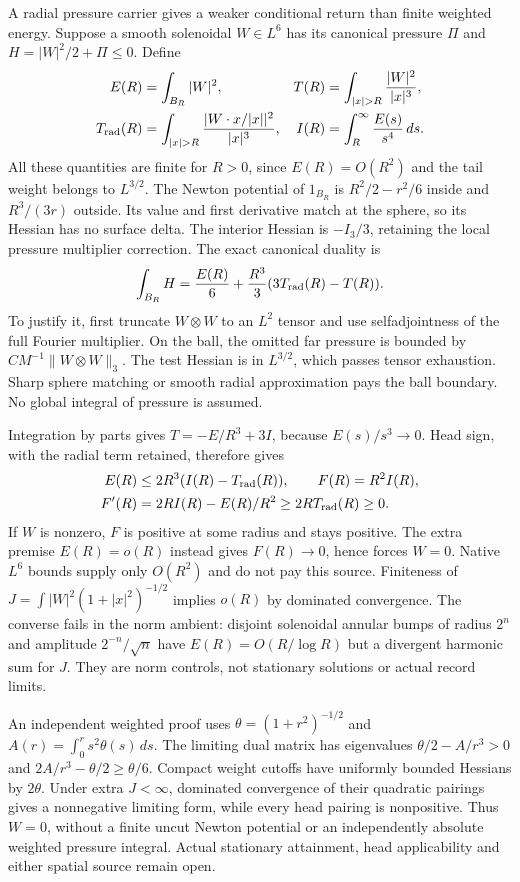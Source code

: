 \documentclass[11pt]{article}
\begin{document}
A radial pressure carrier gives a weaker conditional return than finite
weighted energy. Suppose a smooth solenoidal $W\in L^6$ has its canonical
pressure $\Pi$ and $H=|W|^2/2+\Pi\le0$. Define
\[
 \begin{aligned}
 E(R)&=\int_{B_R}|W|^2,&
 T(R)&=\int_{|x|>R}\frac{|W|^2}{|x|^3},\\
 T_{\rm rad}(R)&=\int_{|x|>R}\frac{|W\cdot x/|x||^2}{|x|^3},&
 I(R)&=\int_R^\infty\frac{E(s)}{s^4}\,ds.
 \end{aligned}
\]
All these quantities are finite for $R>0$, since $E(R)=O(R^2)$ and the
tail weight belongs to $L^{3/2}$. The Newton potential of $1_{B_R}$ is
$R^2/2-r^2/6$ inside and $R^3/(3r)$ outside. Its value and first derivative
match at the sphere, so its Hessian has no surface delta. The interior
Hessian is $-I_3/3$, retaining the local pressure multiplier correction.
The exact canonical duality is
\[
 \int_{B_R}H=\frac{E(R)}6+\frac{R^3}3(3T_{\rm rad}(R)-T(R)).
\]
To justify it, first truncate $W\otimes W$ to an $L^2$ tensor and use
selfadjointness of the full Fourier multiplier. On the ball, the omitted
far pressure is bounded by $CM^{-1}\|W\otimes W\|_3$. The test Hessian is
in $L^{3/2}$, which passes tensor exhaustion. Sharp sphere matching or
smooth radial approximation pays the ball boundary. No global integral
of pressure is assumed.

Integration by parts gives $T=-E/R^3+3I$, because $E(s)/s^3\to0$.
Head sign, with the radial term retained, therefore gives
\[
 \begin{aligned}
 E(R)&\le2R^3(I(R)-T_{\rm rad}(R)),\qquad F(R)=R^2I(R),\\
 F'(R)&=2RI(R)-E(R)/R^2\ge2RT_{\rm rad}(R)\ge0.
 \end{aligned}
\]
If $W$ is nonzero, $F$ is positive at some radius and stays positive.
The extra premise $E(R)=o(R)$ instead gives $F(R)\to0$, hence forces
$W=0$. Native $L^6$ bounds supply only $O(R^2)$ and do not pay this source.
Finiteness of $J=\int|W|^2(1+|x|^2)^{-1/2}$ implies $o(R)$ by dominated
convergence. The converse fails in the norm ambient: disjoint solenoidal
annular bumps of radius $2^n$ and amplitude $2^{-n}/\sqrt n$ have
$E(R)=O(R/\log R)$ but a divergent harmonic sum for $J$. They are norm
controls, not stationary solutions or actual record limits.

An independent weighted proof uses $\theta=(1+r^2)^{-1/2}$ and
$A(r)=\int_0^r s^2\theta(s)\,ds$. The limiting dual matrix has eigenvalues
$\theta/2-A/r^3>0$ and $2A/r^3-\theta/2\ge\theta/6$.
Compact weight cutoffs have uniformly bounded Hessians by $2\theta$.
Under extra $J<\infty$, dominated convergence of their quadratic pairings
gives a nonnegative limiting form, while every head pairing is nonpositive.
Thus $W=0$, without a finite uncut Newton potential or an independently
absolute weighted pressure integral. Actual stationary attainment, head
applicability and either spatial source remain open.
\end{document}
